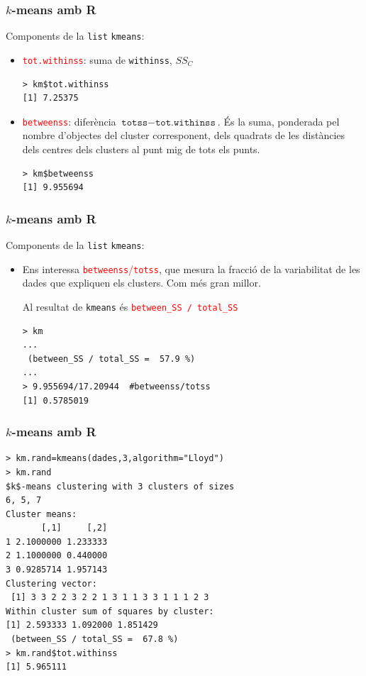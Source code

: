 \documentclass[12pt,t]{beamer}
\newcommand{\red}[1]{\textcolor{red}{#1}}
\theoremstyle{plain}
\theoremstyle{definition}
\begin{document}
\begin{frame}[fragile]
\frametitle{$k$-means amb R}
Components de la \texttt{list} \texttt{kmeans}:

\begin{itemize}
\item \red{\texttt{tot.withinss}}: suma de \texttt{withinss}, $SS_C$
\begin{verbatim}
> km$tot.withinss  
[1] 7.25375
\end{verbatim}
\item \red{\texttt{betweenss}}: diferència  $\texttt{totss}-\texttt{tot.withinss}$. És la suma, ponderada pel nombre d'objectes del cluster corresponent, dels quadrats de les distàncies dels centres dels clusters al punt mig de tots els punts.
\begin{verbatim}
> km$betweenss   
[1] 9.955694
\end{verbatim}
\end{itemize}
\end{frame}

\begin{frame}[fragile]
\frametitle{$k$-means amb R}
Components de la \texttt{list} \texttt{kmeans}:

\begin{itemize}
\item Ens interessa \red{\texttt{betweenss}/\texttt{totss}}, que mesura la fracció de la variabilitat de les dades que expliquen els clusters. Com més gran millor.

Al resultat de \texttt{kmeans} és \red{\texttt{between\_{}SS / total\_{}SS}}
\begin{verbatim}
> km
...
 (between_SS / total_SS =  57.9 %)
...
> 9.955694/17.20944  #betweenss/totss
[1] 0.5785019
\end{verbatim}

\end{itemize}
\end{frame}





\begin{frame}[fragile]
\frametitle{$k$-means amb R}
\vspace*{-2ex}

 
\begin{verbatim}
> km.rand=kmeans(dades,3,algorithm="Lloyd")
> km.rand
$k$-means clustering with 3 clusters of sizes 
6, 5, 7
Cluster means:
       [,1]     [,2]
1 2.1000000 1.233333
2 1.1000000 0.440000
3 0.9285714 1.957143
Clustering vector:
 [1] 3 3 2 2 3 2 2 1 3 1 1 3 3 1 1 1 2 3
Within cluster sum of squares by cluster:
[1] 2.593333 1.092000 1.851429
 (between_SS / total_SS =  67.8 %)
> km.rand$tot.withinss
[1] 5.965111
\end{verbatim}
\end{frame}
\end{document}
